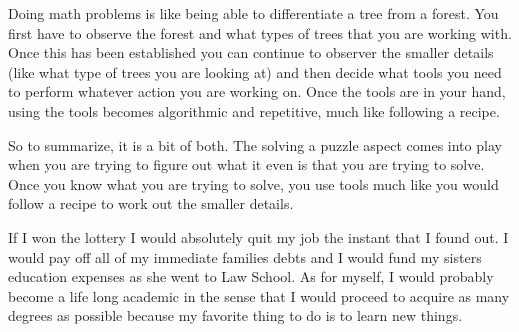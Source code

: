  {
    \begin{highlight}
        Doing math problems is like being able to differentiate a tree from a forest. You first have to observe the forest and what types of trees that you are working with. Once this has been established
        you can continue to observer the smaller details (like what type of trees you are looking at) and then decide what tools you need to perform whatever action you are working on. Once the tools are
        in your hand, using the tools becomes algorithmic and repetitive, much like following a recipe.

        So to summarize, it is a bit of both. The solving a puzzle aspect comes into play when you are trying to figure out what it even is that you are trying to solve. Once you know what you are trying to
        solve, you use tools much like you would follow a recipe to work out the smaller details.
    \end{highlight}
}

 {
    \begin{highlight}
        If I won the lottery I would absolutely quit my job the instant that I found out. I would pay off all of my immediate families debts and I would fund my sisters education expenses as she went to Law
        School. As for myself, I would probably become a life long academic in the sense that I would proceed to acquire as many degrees as possible because my favorite thing to do is to learn new things.
    \end{highlight}
}